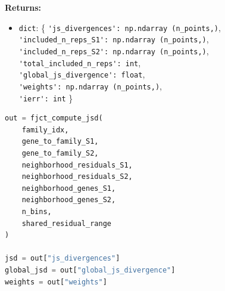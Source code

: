 \begin{enumerate}
        \textbf{Returns:}
        \begin{itemize}
            \item \lstinline!dict!: \{
                \lstinline!'js_divergences': np.ndarray (n_points,)!,\\
                \lstinline!'included_n_reps_S1': np.ndarray (n_points,)!,\\
                \lstinline!'included_n_reps_S2': np.ndarray (n_points,)!,\\
                \lstinline!'total_included_n_reps': int!,\\
                \lstinline!'global_js_divergence': float!,\\
                \lstinline!'weights': np.ndarray (n_points,)!,\\
                \lstinline!'ierr': int!
            \}
        \end{itemize}

        \begin{lstlisting}[language=Python, caption={Family-Level JSD Computation}]
out = fjct_compute_jsd(
    family_idx,
    gene_to_family_S1,
    gene_to_family_S2,
    neighborhood_residuals_S1,
    neighborhood_residuals_S2,
    neighborhood_genes_S1,
    neighborhood_genes_S2,
    n_bins,
    shared_residual_range
)

jsd = out["js_divergences"]
global_jsd = out["global_js_divergence"]
weights = out["weights"]
        \end{lstlisting}
\end{enumerate}